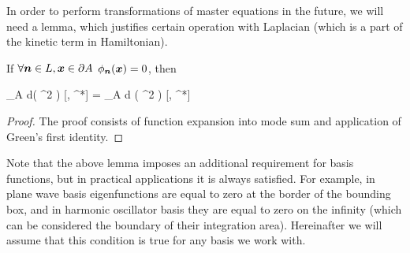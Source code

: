 In order to perform transformations of master equations in the future,
we will need a lemma, which justifies certain operation with Laplacian
(which is a part of the kinetic term in Hamiltonian).

\begin{lemma}
\label{lmm:func-calculus:move-laplacian}
	If $\forall \boldsymbol{n} \in L, \boldsymbol{x} \in \partial A$ $\phi_{\boldsymbol{n}}(\boldsymbol{x}) = 0$, then
	\begin{eqn*}
		\int\limits_A d\xvec \left(
			\nabla^2 \frac{\delta}{\delta \Psi}
		\right) \Psi {}[\Psi, \Psi^*]
		= \int\limits_A d\xvec \frac{\delta}{\delta \Psi}
		( \nabla^2 \Psi ) [\Psi, \Psi^*]
	\end{eqn*}
\end{lemma}
\begin{proof}
The proof consists of function expansion into mode sum and application of Green's first identity.
\end{proof}

Note that the above lemma imposes an additional requirement for basis functions, but in practical applications it is always satisfied.
For example, in plane wave basis eigenfunctions are equal to zero at the border of the bounding box, and in harmonic oscillator basis they are equal to zero on the infinity (which can be considered the boundary of their integration area).
Hereinafter we will assume that this condition is true for any basis we work with.
